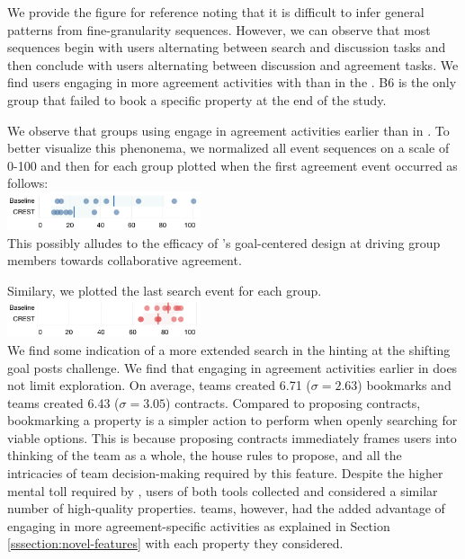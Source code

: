 We provide the figure for reference noting that it is difficult to infer general patterns from fine-granularity sequences. However, we can observe that most sequences begin with users alternating between search and discussion tasks and then conclude with users alternating between discussion and agreement tasks. We find users engaging in more agreement activities with \tool than in the \baseline. B6 is the only group that failed to book a specific property at the end of the study.

We observe that groups using \tool engage in agreement activities earlier than in \baseline. To better visualize this phenonema, we normalized all event sequences on a scale of 0-100 and then for each group plotted when the first agreement event occurred as follows:\\
\includegraphics[height=42px]{images/Norm_Agreement_Start.pdf}\\[0.1cm]
This possibly alludes to the efficacy of \tool's goal-centered design at driving group members towards collaborative agreement. 

Similary, we plotted the last search event for each group. \\[0.1cm]
\includegraphics[height=42px]{images/SearchEnd.pdf}\\
We find some indication of a more extended search in the \baseline hinting at the shifting goal posts challenge. We find that engaging in agreement activities earlier in \tool does not limit exploration. On average, \baseline teams created 6.71 ($\sigma = 2.63$) bookmarks and \tool teams created 6.43 ($\sigma = 3.05$) contracts. Compared to proposing contracts, bookmarking a property is a simpler action to perform when openly searching for viable options. This is because proposing contracts immediately frames users into thinking of the team as a whole, the house rules to propose, and all the intricacies of team decision-making required by this feature. Despite the higher mental toll required by \tool, users of both tools collected and considered a similar number of high-quality properties. \tool teams, however, had the added advantage of engaging in more agreement-specific activities as explained in Section \ref{sssection:novel-features} with each property they considered.

